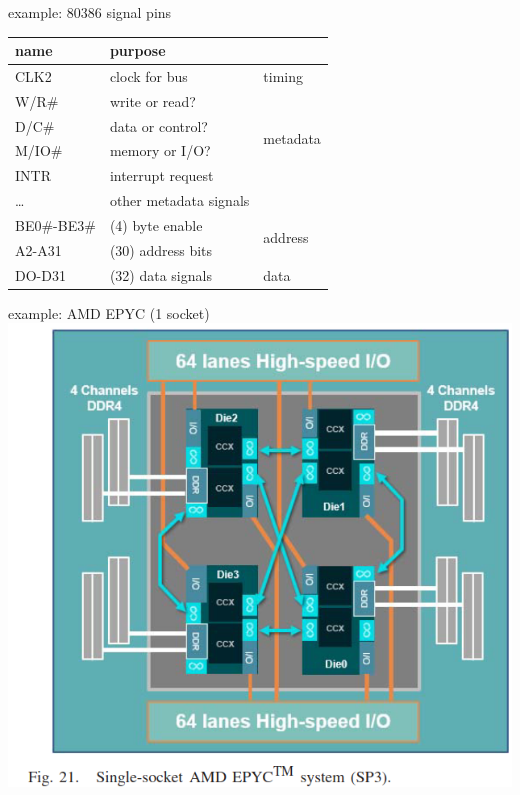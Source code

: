 

\begin{frame}{example: 80386 signal pins}
\begin{tabular}{|l|l|l|}
\hline
\bfseries name & \multicolumn{2}{|l|}{\bfseries purpose} \\ \hline 
CLK2 & clock for bus & timing\\ \hline
W/R\# & write or read? & \multirow{4}{*}{metadata} \\ \cline{1-2}
D/C\# & data or control? &~ \\ \cline{1-2}
M/IO\# & memory or I/O? &~\\ \cline{1-2}
INTR & interrupt request &~\\ \cline{1-2}
\ldots & other metadata signals &~\\ \hline
BE0\#-BE3\# & (4) byte enable & \multirow{2}{*}{address} \\\cline{1-2}
A2-A31 & (30) address bits &~\\ \hline
DO-D31 & (32) data signals & data\\ \hline
\end{tabular}
\end{frame}

\begin{frame}{example: AMD EPYC (1 socket)}
\includegraphics[height=0.9\textheight]{../buses/zepplin-fig21}
\end{frame}

